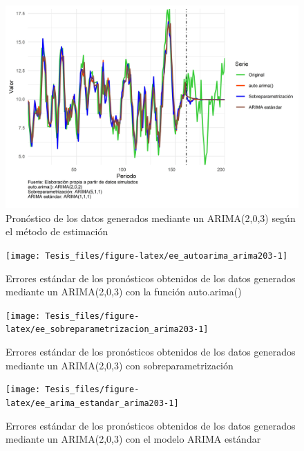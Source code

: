 \documentclass[
]{article}
\begin{document}
\begin{figure}[H]
\includegraphics[width=1\linewidth,height=1\textheight]{Tesis_files/figure-latex/pronostico_arima203-1} \caption{Pronóstico de los datos generados mediante un ARIMA(2,0,3) según el método de estimación}\label{fig:pronostico_arima203}
\end{figure}

\begin{figure}[H]
\texttt{[image: Tesis\_files/figure-latex/ee\_autoarima\_arima203-1]} \caption{Errores estándar de los pronósticos obtenidos de los datos generados mediante un ARIMA(2,0,3) con la función auto.arima()}\label{fig:ee_autoarima_arima203}
\end{figure}

\begin{figure}[H]
\texttt{[image: Tesis\_files/figure-latex/ee\_sobreparametrizacion\_arima203-1]} \caption{Errores estándar de los pronósticos obtenidos de los datos generados mediante un ARIMA(2,0,3) con sobreparametrización}\label{fig:ee_sobreparametrizacion_arima203}
\end{figure}

\begin{figure}[H]
\texttt{[image: Tesis\_files/figure-latex/ee\_arima\_estandar\_arima203-1]} \caption{Errores estándar de los pronósticos obtenidos de los datos generados mediante un ARIMA(2,0,3) con el modelo ARIMA estándar}\label{fig:ee_arima_estandar_arima203}
\end{figure}
\end{document}
